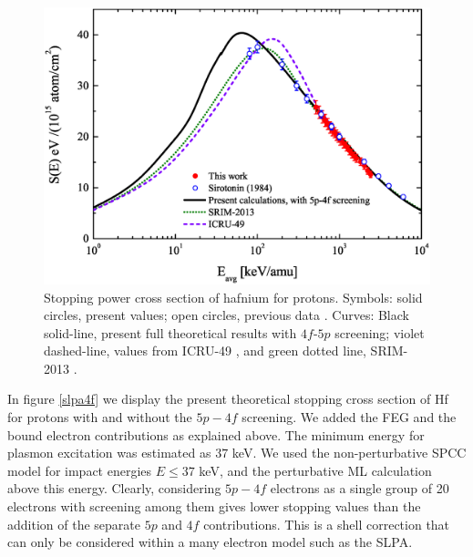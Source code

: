 \documentclass[aps,prb,reprint,groupedaddress]{revtex4-1}
\begin{document}
\begin{figure}[!t]
\centering
\includegraphics[width=13.0cm]{Fig03.eps}
\caption{Stopping power cross section of hafnium for protons. Symbols: solid circles, present values; open circles, previous data \cite{Sirotinin}. Curves: Black solid-line, present full theoretical results with $4f$-$5p$ screening; violet dashed-line, values from ICRU-49 \cite{ICRU49}, and green dotted line, SRIM-2013 \cite{Ziegler01}.}
\label{F03}
\end{figure}

In figure \ref{slpa4f} we display the present theoretical stopping cross section of Hf for protons with and without the $5p-4f$ screening. We added the FEG and the bound electron contributions as explained above. The minimum energy for plasmon excitation was estimated as $37$ keV. We used the non-perturbative SPCC model for impact energies $E \leq 37$ keV, and the perturbative ML calculation above this energy. %
Clearly, considering $5p-4f$ electrons as a single group of 20 electrons with screening among them gives lower stopping values than the addition of the separate $5p$ and $4f$ contributions. This is a shell correction that can only be considered within a many electron model such as the SLPA.
\end{document}
